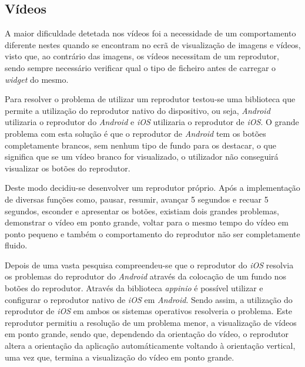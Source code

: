 \subsection{Vídeos}

A maior dificuldade detetada nos vídeos foi a necessidade de um comportamento diferente nestes quando se encontram no ecrã de visualização de imagens e vídeos, visto que, ao contrário das imagens, os vídeos necessitam de um reprodutor, sendo sempre necessário verificar qual o tipo de ficheiro antes de carregar o \textit{widget} do mesmo.

Para resolver o problema de utilizar um reprodutor testou-se uma biblioteca que permite a utilização do reprodutor nativo do dispositivo, ou seja, \textit{Android} utilizaria o reprodutor do \textit{Android} e \textit{iOS} utilizaria o reprodutor de \textit{iOS}. O grande problema com esta solução é que o reprodutor de \textit{Android} tem os botões completamente brancos, sem nenhum tipo de fundo para os destacar, o que significa que se um vídeo branco for visualizado, o utilizador não conseguirá visualizar os botões do reprodutor.

Deste modo decidiu-se desenvolver um reprodutor próprio. Após a implementação de diversas funções como, pausar, resumir, avançar 5 segundos e recuar 5 segundos, esconder e apresentar os botões, existiam dois grandes problemas, demonstrar o vídeo em ponto grande, voltar para o mesmo tempo do vídeo em ponto pequeno e também o comportamento do reprodutor não ser completamente fluido.

Depois de uma vasta pesquisa compreendeu-se que o reprodutor do \textit{iOS} resolvia os problemas do reprodutor do \textit{Android} através da colocação de um fundo nos botões do reprodutor. Através da biblioteca \textit{appinio} é possível utilizar e configurar o reprodutor nativo de \textit{iOS} em \textit{Android}. Sendo assim, a utilização do reprodutor de \textit{iOS} em ambos os sistemas operativos resolveria o problema. Este reprodutor permitiu a resolução de um problema menor, a visualização de vídeos em ponto grande, sendo que, dependendo da orientação do vídeo, o reprodutor altera a orientação da aplicação automáticamente voltando à orientação vertical, uma vez que, termina a visualização do vídeo em ponto grande.